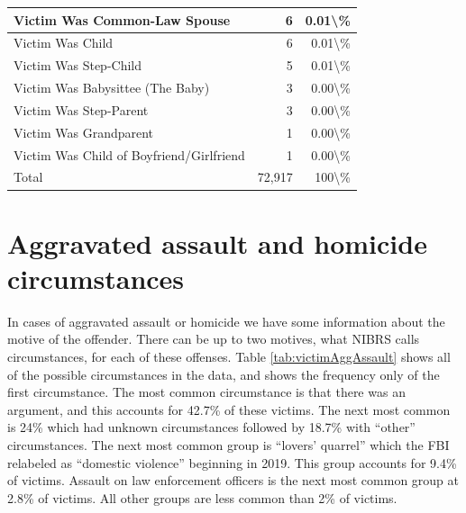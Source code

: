 \documentclass[
]{krantz}
\begin{document}
\begin{longtable}[t]{l|r|r}
\hline
Victim Was Common-Law Spouse & 6 & 0.01\textbackslash{}\%\\
\hline
Victim Was Child & 6 & 0.01\textbackslash{}\%\\
\hline
Victim Was Step-Child & 5 & 0.01\textbackslash{}\%\\
\hline
Victim Was Babysittee (The Baby) & 3 & 0.00\textbackslash{}\%\\
\hline
Victim Was Step-Parent & 3 & 0.00\textbackslash{}\%\\
\hline
Victim Was Grandparent & 1 & 0.00\textbackslash{}\%\\
\hline
Victim Was Child of Boyfriend/Girlfriend & 1 & 0.00\textbackslash{}\%\\
\hline
Total & 72,917 & 100\textbackslash{}\%\\
\hline
\end{longtable}

\section{Aggravated assault and homicide
circumstances}\label{aggravated-assault-and-homicide-circumstances}

In cases of aggravated assault or homicide we have some
information about the motive of the offender. There can be
up to two motives, what NIBRS calls circumstances, for each
of these offenses. Table \ref{tab:victimAggAssault} shows
all of the possible circumstances in the data, and shows the
frequency only of the first circumstance. The most common
circumstance is that there was an argument, and this
accounts for 42.7\% of these victims. The next most common
is 24\% which had unknown circumstances followed by 18.7\%
with ``other'' circumstances. The next most common group is
``lovers' quarrel'' which the FBI relabeled as ``domestic
violence'' beginning in 2019. This group accounts for 9.4\%
of victims. Assault on law enforcement officers is the next
most common group at 2.8\% of victims. All other groups are
less common than 2\% of victims.
\end{document}

